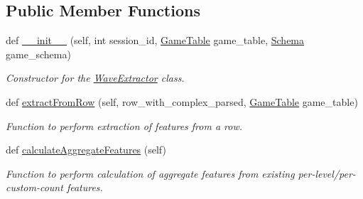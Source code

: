 \subsection*{Public Member Functions}
\begin{DoxyCompactItemize}
\item 
def \mbox{\hyperlink{classfeature__extractors_1_1_wave_extractor_1_1_wave_extractor_ad2acd3dec60e43803dc2d5cc49cda58e}{\+\_\+\+\_\+init\+\_\+\+\_\+}} (self, int session\+\_\+id, \mbox{\hyperlink{class_game_table_1_1_game_table}{Game\+Table}} game\+\_\+table, \mbox{\hyperlink{classschemas_1_1_schema_1_1_schema}{Schema}} game\+\_\+schema)
\begin{DoxyCompactList}\small\item\em Constructor for the \mbox{\hyperlink{classfeature__extractors_1_1_wave_extractor_1_1_wave_extractor}{Wave\+Extractor}} class. \end{DoxyCompactList}\item 
def \mbox{\hyperlink{classfeature__extractors_1_1_wave_extractor_1_1_wave_extractor_a3dbf40e07ac5c4c28037f331cc268798}{extract\+From\+Row}} (self, row\+\_\+with\+\_\+complex\+\_\+parsed, \mbox{\hyperlink{class_game_table_1_1_game_table}{Game\+Table}} game\+\_\+table)
\begin{DoxyCompactList}\small\item\em Function to perform extraction of features from a row. \end{DoxyCompactList}\item 
def \mbox{\hyperlink{classfeature__extractors_1_1_wave_extractor_1_1_wave_extractor_a68b4f2df1be2e63fa34ba3813e77efbb}{calculate\+Aggregate\+Features}} (self)
\begin{DoxyCompactList}\small\item\em Function to perform calculation of aggregate features from existing per-\/level/per-\/custom-\/count features. \end{DoxyCompactList}\end{DoxyCompactItemize}
